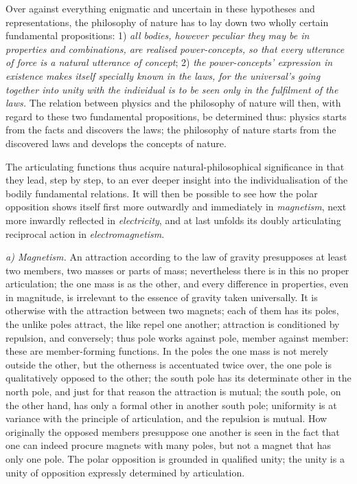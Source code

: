 \documentclass[12pt,a4paper]{book}
\newcommand{\runin}[1]{\emph{#1}\hspace{0.4em}}
\begin{document}
Over against everything enigmatic and uncertain in these hypotheses and representations, the philosophy of nature has to
lay down two wholly certain fundamental
propositions: 1) \emph{all bodies, however peculiar they may be in properties and combinations, are realised
power-concepts, so that every utterance of force is a natural utterance of concept}; 2) \emph{the power-concepts'
expression in existence makes itself specially known in the laws, for the
universal's going together into unity with the individual is to be seen only in the fulfilment of the laws.} The relation
between physics and the philosophy of nature will then, with regard to these two fundamental propositions, be determined
thus: physics starts from the facts and discovers the laws; the philosophy of nature starts from the discovered laws and
develops the concepts of nature.

The articulating functions thus acquire natural-philosophical significance in that they lead, step by step, to an ever
deeper insight into the individualisation of the bodily fundamental relations. It will then be possible to see how the
polar opposition shows itself first more outwardly and immediately in \emph{magnetism}, next more inwardly reflected in
\emph{electricity}, and at last unfolds its doubly articulating reciprocal action in \emph{electromagnetism}.

\runin{a) Magnetism.} An attraction according to the law of gravity presupposes at least two members, two masses or parts
of mass; nevertheless there is in this no proper articulation; the one mass is as the other, and every difference in
properties, even in magnitude, is irrelevant to the essence of gravity taken universally. It is otherwise with the
attraction between two magnets; each of them has its poles, the unlike poles attract, the like repel one another;
attraction is conditioned by repulsion, and conversely; thus pole works against pole, member against member: these are
member-forming functions. In the poles the one mass is not merely outside the other,
but the otherness is accentuated twice over, the one pole is qualitatively opposed to the other; the south pole has its
determinate other in the north pole, and just for that reason the attraction is mutual; the south pole, on the other
hand, has only a formal other in another south pole;
uniformity is at variance with the principle of articulation, and the repulsion is mutual. How originally the opposed
members presuppose one another is seen in the fact that one can indeed procure magnets with many poles, but not a magnet
that has only one pole. The polar opposition is grounded in qualified unity; the unity is a unity of opposition expressly
determined by articulation.
\end{document}
